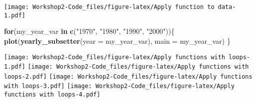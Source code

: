 \documentclass[
]{article}
\newenvironment{Shaded}{\begin{snugshade}}{\end{snugshade}}
\newcommand{\AttributeTok}[1]{\textcolor[rgb]{0.13,0.29,0.53}{#1}}
\newcommand{\ControlFlowTok}[1]{\textcolor[rgb]{0.13,0.29,0.53}{\textbf{#1}}}
\newcommand{\FunctionTok}[1]{\textcolor[rgb]{0.13,0.29,0.53}{\textbf{#1}}}
\newcommand{\NormalTok}[1]{#1}
\newcommand{\StringTok}[1]{\textcolor[rgb]{0.31,0.60,0.02}{#1}}
\begin{document}
\texttt{[image: Workshop2-Code\_files/figure-latex/Apply function to data-1.pdf]}

\begin{Shaded}
\begin{Highlighting}[]
\ControlFlowTok{for}\NormalTok{(my\_year\_var }\ControlFlowTok{in} \FunctionTok{c}\NormalTok{(}\StringTok{"1970"}\NormalTok{, }\StringTok{"1980"}\NormalTok{, }\StringTok{"1990"}\NormalTok{, }\StringTok{"2000"}\NormalTok{))\{}
  \FunctionTok{plot}\NormalTok{(}\FunctionTok{yearly\_subsetter}\NormalTok{(}\AttributeTok{year =}\NormalTok{ my\_year\_var), }\AttributeTok{main =}\NormalTok{ my\_year\_var)}
\NormalTok{\}}
\end{Highlighting}
\end{Shaded}

\texttt{[image: Workshop2-Code\_files/figure-latex/Apply functions with loops-1.pdf]}
\texttt{[image: Workshop2-Code\_files/figure-latex/Apply functions with loops-2.pdf]}
\texttt{[image: Workshop2-Code\_files/figure-latex/Apply functions with loops-3.pdf]}
\texttt{[image: Workshop2-Code\_files/figure-latex/Apply functions with loops-4.pdf]}
\end{document}
